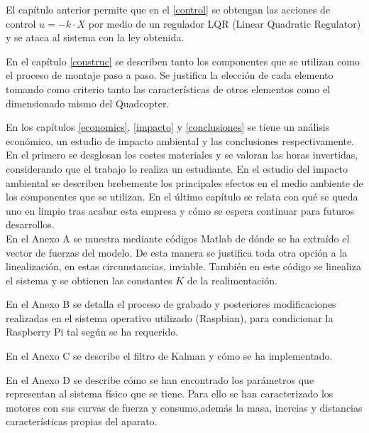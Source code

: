 \documentclass[twoside,11pt]{book}
\begin{document}
El capítulo anterior permite que en el \ref{control} se obtengan las acciones de control $u=-k \cdot X$ por medio de un regulador LQR (Linear Quadratic Regulator) y se ataca al sistema con la ley obtenida.


En el capítulo \ref{construc} se describen tanto los componentes que se utilizan como el proceso de montaje paso a paso. Se justifica la elección de cada elemento tomando como criterio tanto las características de otros elementos como el dimensionado mismo del Quadcopter. 

En los capítulos \ref{economics}, \ref{impacto} y \ref{conclusiones} se tiene un análisis económico, un  estudio de impacto ambiental y las conclusiones respectivamente. En el primero se desglosan los costes materiales y se valoran las horas invertidas, considerando que el trabajo lo realiza un estudiante. En el estudio del impacto ambiental se describen brebemente los principales efectos en el medio ambiente de los componentes que se utilizan. En el último capítulo se relata con qué se queda uno en limpio tras acabar esta empresa y cómo se espera continuar para futuros desarrollos.\\

En el Anexo A se muestra mediante códigos Matlab de dónde se ha extraído el vector de fuerzas del modelo. De esta manera se justifica toda otra opción a la linealización, en estas circunstancias, inviable. También en este código se linealiza el sistema y se obtienen las constantes $K$ de la realimentación.

En el Anexo B se detalla el proceso de grabado y posteriores modificaciones realizadas en el sistema operativo utilizado (Raspbian), para condicionar la Raspberry Pi tal según se ha requerido.
 
En el Anexo C se describe el filtro de Kalman y cómo se ha implementado. 

En el Anexo D se describe cómo se han encontrado los parámetros que representan al sistema físico que se tiene. Para ello se han caracterizado los motores con sus curvas de fuerza y consumo,además la masa, inercias y distancias características propias del aparato.


\newpage
\end{document}
